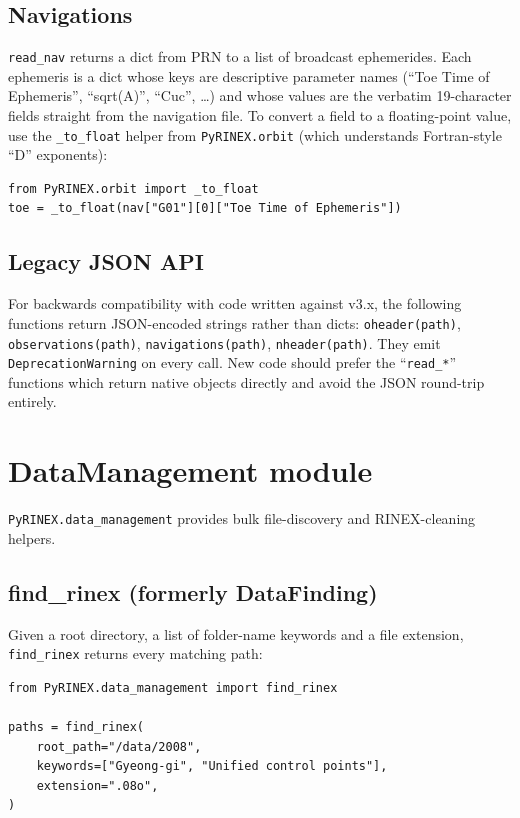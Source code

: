 \documentclass[11pt,a4paper]{article}
\begin{document}
\subsection{Navigations}

\texttt{read\_nav} returns a dict from PRN to a list of broadcast
ephemerides. Each ephemeris is a dict whose keys are descriptive
parameter names (``Toe Time of Ephemeris'', ``sqrt(A)'',
``Cuc'', \dots) and whose values are the verbatim 19-character
fields straight from the navigation file. To convert a field to a
floating-point value, use the \texttt{\_to\_float} helper from
\texttt{PyRINEX.orbit} (which understands Fortran-style ``D''
exponents):

\begin{lstlisting}
from PyRINEX.orbit import _to_float
toe = _to_float(nav["G01"][0]["Toe Time of Ephemeris"])
\end{lstlisting}

\subsection{Legacy JSON API}

For backwards compatibility with code written against v3.x, the
following functions return JSON-encoded strings rather than dicts:
\texttt{oheader(path)}, \texttt{observations(path)},
\texttt{navigations(path)}, \texttt{nheader(path)}. They emit
\texttt{DeprecationWarning} on every call. New code should prefer the
``\texttt{read\_*}'' functions which return native objects directly
and avoid the JSON round-trip entirely.

\section{DataManagement module}

\texttt{PyRINEX.data\_management} provides bulk file-discovery and
RINEX-cleaning helpers.

\subsection{find\_rinex (formerly DataFinding)}
\label{sec:findrinex}

Given a root directory, a list of folder-name keywords and a file
extension, \texttt{find\_rinex} returns every matching path:

\begin{lstlisting}
from PyRINEX.data_management import find_rinex

paths = find_rinex(
    root_path="/data/2008",
    keywords=["Gyeong-gi", "Unified control points"],
    extension=".08o",
)
\end{lstlisting}
\end{document}
